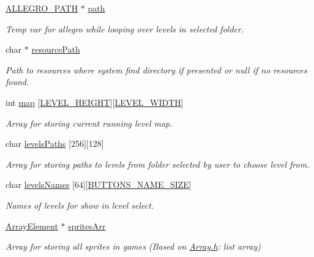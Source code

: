 \begin{DoxyCompactItemize}
\hyperlink{path_8h_afb91cf0e7626a148a3950c8351e4c9c8}{A\+L\+L\+E\+G\+R\+O\+\_\+\+P\+A\+TH} $\ast$ \hyperlink{group___library_merger_ga79bd92474fc256263841144176127d9b}{path}
\begin{DoxyCompactList}\small\item\em Temp var for allegro while looping over levels in selected folder. \end{DoxyCompactList}\item 
char $\ast$ \hyperlink{group___library_merger_gabdcd64f05e152660b88aa7beefcd2b09}{resource\+Path}
\begin{DoxyCompactList}\small\item\em Path to resources where system find directory if presented or null if no resources found. \end{DoxyCompactList}\item 
int \hyperlink{group___library_merger_gaf3cf0ba525aea0327b3c3512df21094a}{map} \mbox{[}\hyperlink{group___library_merger_ga16621561d55e77faa59fbfdae692916f}{L\+E\+V\+E\+L\+\_\+\+H\+E\+I\+G\+HT}\mbox{]}\mbox{[}\hyperlink{group___library_merger_ga219cc98394ab36a78470c0627c4f8464}{L\+E\+V\+E\+L\+\_\+\+W\+I\+D\+TH}\mbox{]}
\begin{DoxyCompactList}\small\item\em Array for storing current running level map. \end{DoxyCompactList}\item 
char \hyperlink{group___library_merger_ga5a00f62db43aff74971290ceba5fa7df}{levels\+Paths} \mbox{[}256\mbox{]}\mbox{[}128\mbox{]}
\begin{DoxyCompactList}\small\item\em Array for storing paths to levels from folder selected by user to choose level from. \end{DoxyCompactList}\item 
char \hyperlink{group___library_merger_gae5cb82a78ca4ac2c20f9d071e7124f38}{levels\+Names} \mbox{[}64\mbox{]}\mbox{[}\hyperlink{group___button_ga5a86b4b0ec8a21993f74ae423ec74538}{B\+U\+T\+T\+O\+N\+S\+\_\+\+N\+A\+M\+E\+\_\+\+S\+I\+ZE}\mbox{]}
\begin{DoxyCompactList}\small\item\em Names of levels for show in level select. \end{DoxyCompactList}\item 
\hyperlink{_array_8h_a2e42efa76d727b8eb3084aac5baf2292}{Array\+Element} $\ast$ \hyperlink{group___library_merger_gaff9189abc1a89e6f7704d68d1de9f5ca}{sprites\+Arr}
\begin{DoxyCompactList}\small\item\em Array for storing all sprites in games (Based on \hyperlink{_array_8h}{Array.\+h}\+: list array) \end{DoxyCompactList}\end{DoxyCompactItemize}



